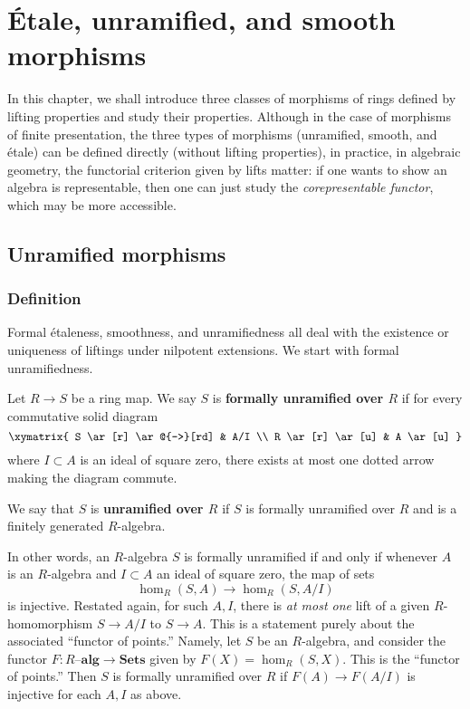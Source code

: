 \chapter{\'Etale, unramified, and smooth morphisms}


In this chapter, we shall introduce three classes of morphisms of rings
defined by lifting properties and study their properties.
Although in the case of morphisms of finite presentation, the three types of
morphisms (unramified, smooth, and \'etale) can be defined directly (without
lifting properties), in practice, in algebraic geometry, the functorial
criterion given by lifts matter: if one wants to show an algebra is
representable, then one can just study the \emph{corepresentable functor},
which may be more accessible.

\section{Unramified morphisms}
\label{section-formally-unramified}


\subsection{Definition}

Formal \'etaleness, smoothness, and unramifiedness all deal with the existence
or uniqueness of liftings under nilpotent extensions. We start with formal
unramifiedness. 

\begin{definition}
\label{definition-formally-unramified}
Let $R \to S$ be a ring map.
We say $S$ is {\bf formally unramified over $R$} if for every
commutative solid diagram
\begin{equation} \label{inflift}
\xymatrix{
S \ar[r] \ar@{-->}[rd] & A/I \\
R \ar[r] \ar[u] & A \ar[u]
}
\end{equation}
where $I \subset A$ is an ideal of square zero, there exists
at most one dotted arrow making the diagram commute.

We say that $S$ is \textbf{unramified over $R$} if $S$ is formally unramified
over $R$ and is a finitely generated $R$-algebra.
\end{definition}

In other words, an $R$-algebra $S$ is formally unramified if and only if
whenever $A$ is an $R$-algebra and $I \subset A$ an ideal of square zero, the
map of sets
\[ \hom_R(S, A) \to \hom_R(S, A/I)  \]
is injective.
Restated again, for such $A, I$, there is \emph{at most one}  lift of a given
$R$-homomorphism $S \to A/I$ to $S \to A$.
This is a statement purely about the associated ``functor of points.''
Namely, let $S$ be an $R$-algebra, and consider the functor $F:
R\text{--}\mathbf{alg}
\to \mathbf{Sets}$ given by $F(X) = \hom_R(S, X)$.
This is the ``functor of points.''
Then $S$ is formally unramified over $R$ if $F(A) \to F(A/I)$ is injective for each
$A, I$ as above. 


